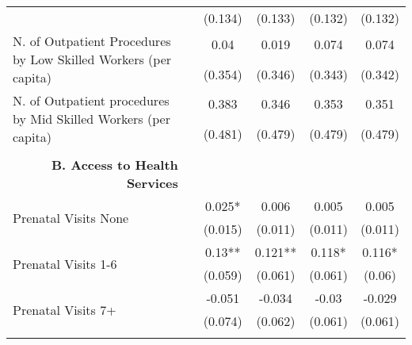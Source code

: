 \begin{table}[H]
\begin{footnotesize}
\begin{center}
{\begin{threeparttable}[b]
\begin{tabular}{rrrrrr}
          &       & \multicolumn{1}{c}{(0.134)} & \multicolumn{1}{c}{(0.133)} & \multicolumn{1}{c}{(0.132)} & \multicolumn{1}{c}{ (0.132) } \\
    \multicolumn{1}{l}{\multirow{2}[0]{*}{N. of Outpatient Procedures by Low Skilled Workers (per capita)}} &       & \multicolumn{1}{c}{0.04} & \multicolumn{1}{c}{0.019} & \multicolumn{1}{c}{0.074} & \multicolumn{1}{c}{ 0.074 } \\
          &       & \multicolumn{1}{c}{(0.354)} & \multicolumn{1}{c}{(0.346)} & \multicolumn{1}{c}{(0.343)} & \multicolumn{1}{c}{ (0.342) } \\
    \multicolumn{1}{l}{\multirow{2}[0]{*}{N. of Outpatient procedures by Mid Skilled Workers (per capita)}} &       & \multicolumn{1}{c}{0.383} & \multicolumn{1}{c}{0.346} & \multicolumn{1}{c}{0.353} & \multicolumn{1}{c}{ 0.351 } \\
          &       & \multicolumn{1}{c}{(0.481)} & \multicolumn{1}{c}{(0.479)} & \multicolumn{1}{c}{(0.479)} & \multicolumn{1}{c}{ (0.479) } \\
          &       &       &       &       &  \\
    \midrule
    \multicolumn{1}{p{26.355em}}{\textbf{B. Access to Health Services}} &       &       &       &       &  \\
    \multicolumn{1}{l}{\multirow{2}[0]{*}{Prenatal Visits None}} &       & \multicolumn{1}{c}{0.025*} & \multicolumn{1}{c}{0.006} & \multicolumn{1}{c}{0.005} & \multicolumn{1}{c}{0.005} \\
          &       & \multicolumn{1}{c}{(0.015)} & \multicolumn{1}{c}{(0.011)} & \multicolumn{1}{c}{(0.011)} & \multicolumn{1}{c}{(0.011)} \\
    \multicolumn{1}{l}{\multirow{2}[0]{*}{Prenatal Visits 1-6}} &       & \multicolumn{1}{c}{0.13**} & \multicolumn{1}{c}{0.121**} & \multicolumn{1}{c}{0.118*} & \multicolumn{1}{c}{0.116*} \\
          &       & \multicolumn{1}{c}{(0.059)} & \multicolumn{1}{c}{(0.061)} & \multicolumn{1}{c}{(0.061)} & \multicolumn{1}{c}{(0.06)} \\
    \multicolumn{1}{l}{\multirow{2}[0]{*}{Prenatal Visits 7+}} &       & \multicolumn{1}{c}{-0.051} & \multicolumn{1}{c}{-0.034} & \multicolumn{1}{c}{-0.03} & \multicolumn{1}{c}{-0.029} \\
          &       & \multicolumn{1}{c}{(0.074)} & \multicolumn{1}{c}{(0.062)} & \multicolumn{1}{c}{(0.061)} & \multicolumn{1}{c}{(0.061)} \\
          &       &       &       &       &  \\
    \bottomrule
    \bottomrule
    \end{tabular}%
    
    
  \label{table:production}%

\end{threeparttable}
}
\end{center}
\end{footnotesize}
\end{table}